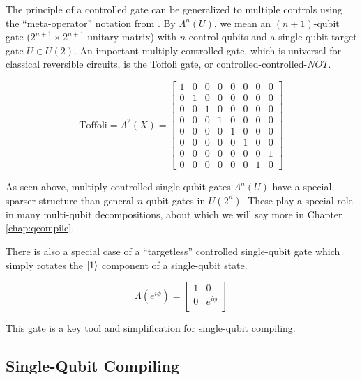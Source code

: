 The principle of a controlled gate can be generalized to multiple
controls using the ``meta-operator'' notation from \cite{Kitaev2002}.
By $\Lambda^n(U)$, we mean an $(n+1)$-qubit gate ($2^{n+1} \times 2^{n+1}$
unitary matrix) with $n$ control qubits and a single-qubit target gate
$U \in U(2)$. An important multiply-controlled gate, which is universal
for classical reversible circuits, is the Toffoli gate, or controlled-controlled-$NOT$.

\begin{equation}
\text{Toffoli} = \Lambda^2(X) = 
 \left[
  \begin{array}{cccccccc}
    1 & 0 & 0 & 0 & 0 & 0 & 0 & 0 \\
    0 & 1 & 0 & 0 & 0 & 0 & 0 & 0 \\
    0 & 0 & 1 & 0 & 0 & 0 & 0 & 0 \\
    0 & 0 & 0 & 1 & 0 & 0 & 0 & 0 \\
    0 & 0 & 0 & 0 & 1 & 0 & 0 & 0 \\
    0 & 0 & 0 & 0 & 0 & 1 & 0 & 0 \\
    0 & 0 & 0 & 0 & 0 & 0 & 0 & 1 \\
    0 & 0 & 0 & 0 & 0 & 0 & 1 & 0
  \end{array} \right]
\end{equation}

As seen above, multiply-controlled single-qubit gates $\Lambda^n(U)$ have a
special, sparser structure than general $n$-qubit gates in $U(2^n)$.
These play a special role in many multi-qubit decompositions, about which
we will say more in Chapter \ref{chap:qcompile}.

There is also a special case of a ``targetless'' controlled single-qubit
gate which simply rotates the $\left\vert{1}\right\rangle$ component of a single-qubit state.

\begin{equation}
\Lambda(e^{i\phi}) = 
 \left[
  \begin{array}{cc}
    1 & 0 \\
    0 & e^{i\phi} \\
  \end{array} \right]
\end{equation}

This gate is a key tool and simplification for single-qubit compiling.

\subsection{Single-Qubit Compiling}
\label{subsec:qcompile-single}

